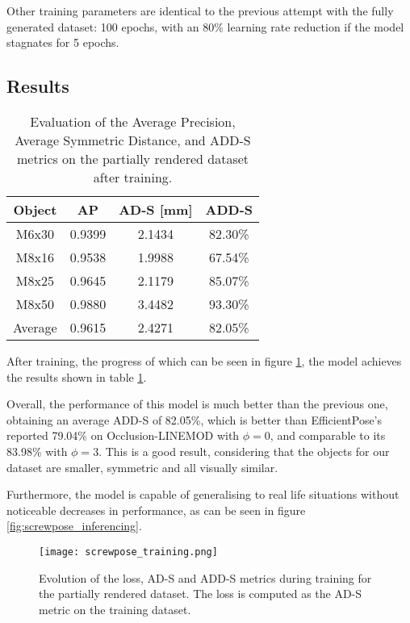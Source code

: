 Other training parameters are identical to the previous attempt with the fully generated dataset: 100 epochs, with an 80\% learning rate reduction if the model stagnates for 5 epochs.

\subsection{Results}

\begin{table}[ht]
    \begin{center}
        \begin{tabular}{|c||c|c|c|}
            \hline
            Object & AP & AD-S [mm] & ADD-S \\
            \hline \hline
            M6x30 & 0.9399 & 2.1434 & 82.30\% \\
            M8x16 & 0.9538 & 1.9988 & 67.54\% \\
            M8x25 & 0.9645 & 2.1179 & 85.07\% \\
            M8x50 & 0.9880 & 3.4482 & 93.30\% \\
            \hline \hline
            Average & 0.9615 & 2.4271 & 82.05\% \\
            \hline    
        \end{tabular}
        \caption{Evaluation of the Average Precision, Average Symmetric Distance, and ADD-S metrics on the partially rendered dataset after training.}
        \label{tab:screwpose}
    \end{center}
\end{table}

After training, the progress of which can be seen in figure \ref{fig:screwpose_training}, the model achieves the results shown in table \ref{tab:screwpose}.

Overall, the performance of this model is much better than the previous one, obtaining an average ADD-S of 82.05\%, which is better than EfficientPose's reported 79.04\% on Occlusion-LINEMOD with $\phi=0$, and comparable to its 83.98\% with $\phi = 3$. This is a good result, considering that the objects for our dataset are smaller, symmetric and all visually similar.

Furthermore, the model is capable of generalising to real life situations without noticeable decreases in performance, as can be seen in figure \ref{fig:screwpose_inferencing}.

\begin{figure}[ht]
    \texttt{[image: screwpose\_training.png]}
    \caption{Evolution of the loss, AD-S and ADD-S metrics during training for the partially rendered dataset. The loss is computed as the AD-S metric on the training dataset.}
    \label{fig:screwpose_training}
\end{figure}

